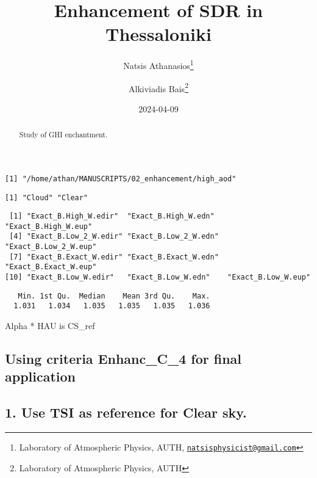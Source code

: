 \documentclass[
  10pt,
  a4paper,oneside]{article}
\title{Enhancement of SDR in Thessaloniki}
\author{Natsis Athanasios\footnote{Laboratory of Atmospheric Physics, AUTH, \href{mailto:natsisphysicist@gmail.com}{\nolinkurl{natsisphysicist@gmail.com}}} \and Alkiviadis Bais\footnote{Laboratory of Atmospheric Physics, AUTH}}
\date{2024-04-09}
\begin{document}
\maketitle
\begin{abstract}
Study of GHI enchantment.
\end{abstract}

{
\hypersetup{linkcolor=}
\setcounter{tocdepth}{4}
\tableofcontents
}
\begin{verbatim}
[1] "/home/athan/MANUSCRIPTS/02_enhancement/high_aod"
\end{verbatim}

\begin{verbatim}
[1] "Cloud" "Clear"
\end{verbatim}

\begin{verbatim}
 [1] "Exact_B.High_W.edir"  "Exact_B.High_W.edn"   "Exact_B.High_W.eup"  
 [4] "Exact_B.Low_2_W.edir" "Exact_B.Low_2_W.edn"  "Exact_B.Low_2_W.eup" 
 [7] "Exact_B.Exact_W.edir" "Exact_B.Exact_W.edn"  "Exact_B.Exact_W.eup" 
[10] "Exact_B.Low_W.edir"   "Exact_B.Low_W.edn"    "Exact_B.Low_W.eup"   
\end{verbatim}

\begin{verbatim}
   Min. 1st Qu.  Median    Mean 3rd Qu.    Max. 
  1.031   1.034   1.035   1.035   1.035   1.036 
\end{verbatim}

Alpha * HAU is CS\_ref

\hypertarget{using-criteria-enhanc_c_4-for-final-application}{%
\subsection{\texorpdfstring{Using criteria \textbf{Enhanc\_C\_4} for final application}{Using criteria Enhanc\_C\_4 for final application}}\label{using-criteria-enhanc_c_4-for-final-application}}

\hypertarget{use-tsi-as-reference-for-clear-sky.}{%
\subsection{1. Use TSI as reference for Clear sky.}\label{use-tsi-as-reference-for-clear-sky.}}
\end{document}
